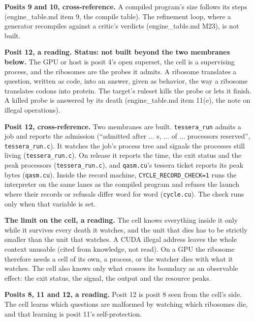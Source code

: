 \textbf{Posits 9 and 10, cross-reference.} A compiled program's size follows its steps (engine\_\allowbreak{}table.md item 9, the compile table). The refinement loop, where a generator recompiles against a critic's verdicts (engine\_\allowbreak{}table.md M23), is not built.

\textbf{Posit 12, a reading. Status: not built beyond the two membranes below.} The GPU or host is posit 4's open superset, the cell is a supervising process, and the ribosomes are the probes it admits. A ribosome translates a question, written as code, into an answer, given as behavior, the way a ribosome translates codons into protein. The target's ruleset kills the probe or lets it finish. A killed probe is answered by its death (engine\_\allowbreak{}table.md item 11(e), the note on illegal operations).

\textbf{Posit 12, cross-reference.} Two membranes are built. \texttt{tessera\_\allowbreak{}run} admits a job and reports the admission (“admitted after ... s, ... of ... processors reserved”, \texttt{tessera\_\allowbreak{}run.\allowbreak{}c}). It watches the job's process tree and signals the processes still living (\texttt{tessera\_\allowbreak{}run.\allowbreak{}c}). On release it reports the time, the exit status and the peak processors (\texttt{tessera\_\allowbreak{}run.\allowbreak{}c}), and \texttt{qasm.\allowbreak{}cu}'s tessera ticket reports its peak bytes (\texttt{qasm.\allowbreak{}cu}). Inside the record machine, \texttt{CYCLE\_\allowbreak{}RECORD\_\allowbreak{}CHECK=1} runs the interpreter on the same lanes as the compiled program and refuses the launch where their records or refusals differ word for word (\texttt{cycle.\allowbreak{}cu}). The check runs only when that variable is set.

\textbf{The limit on the cell, a reading.} The cell knows everything inside it only while it survives every death it watches, and the unit that dies has to be strictly smaller than the unit that watches. A CUDA illegal address leaves the whole context unusable (cited from knowledge, not read). On a GPU the ribosome therefore needs a cell of its own, a process, or the watcher dies with what it watches. The cell also knows only what crosses its boundary as an observable effect: the exit status, the signal, the output and the resource peaks.

\textbf{Posits 8, 11 and 12, a reading.} Posit 12 is posit 8 seen from the cell's side. The cell learns which questions are malformed by watching which ribosomes die, and that learning is posit 11's self-protection.

